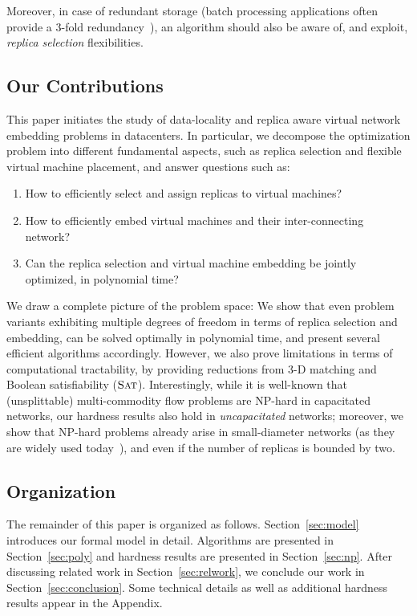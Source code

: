 \documentclass[9pt]{sigcomm-alternate}
\newcommand{\SAT}{\textsc{Sat}}
\begin{document}
Moreover, in case of redundant storage (batch processing
applications often provide a 3-fold redundancy~\cite{hdfs}), an algorithm should also be aware of, and exploit, \emph{replica selection}
flexibilities.

\subsection{Our Contributions}

This paper initiates the study of data-locality and replica aware virtual network embedding problems in datacenters.
In particular, we decompose the optimization problem into different fundamental aspects, such as
replica selection and flexible virtual machine placement, and answer questions such as:
\begin{enumerate}
\item How to efficiently select and assign replicas to virtual machines?

\item How to efficiently embed virtual machines and their inter-connecting network?

\item Can the replica selection and virtual machine embedding be jointly optimized, in polynomial time?
\end{enumerate}

We draw a complete picture of the problem space: We show that
even problem variants exhibiting multiple degrees of freedom in terms of
replica selection and embedding,
can be solved optimally in polynomial time, and present several efficient 
algorithms accordingly. However, we also prove limitations in terms of
computational tractability, by providing reductions from 3-D matching
and Boolean satisfiability ($\SAT$). Interestingly,
while it is well-known that (unsplittable) multi-commodity flow
problems are NP-hard in capacitated networks, our hardness results also hold in \emph{uncapacitated}
networks; moreover, we show that NP-hard problems already arise in small-diameter networks (as they are
widely used today~\cite{fattree}),
and even if the number of replicas is bounded by two.


\subsection{Organization}

The remainder of this paper is organized as follows.
Section~\ref{sec:model} introduces our formal model in detail.
Algorithms are presented in Section~\ref{sec:poly} and
hardness results are presented in Section~\ref{sec:np}.
After discussing related work in Section~\ref{sec:relwork},
we conclude our work in Section~\ref{sec:conclusion}.
Some technical details as well as additional hardness results
appear in the Appendix.
\end{document}
